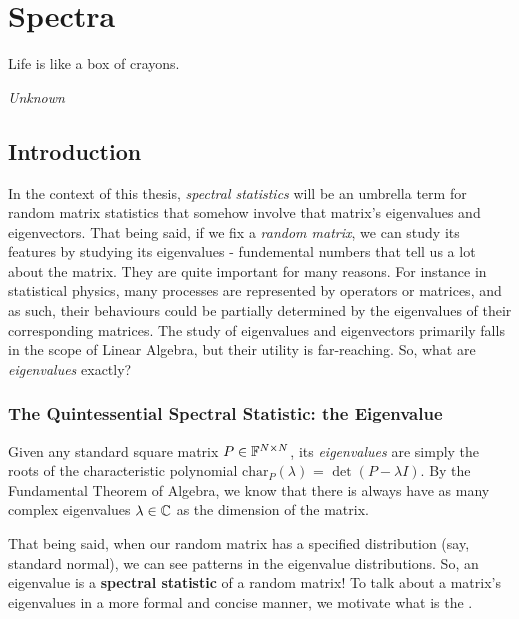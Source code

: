 
\chapter{Spectra}

\epigraph{Life is like a box of crayons.}{\textit{Unknown}}

\section{Introduction}

In the context of this thesis, \textit{spectral statistics} will be an umbrella term for random matrix statistics that somehow involve that matrix's eigenvalues and eigenvectors.
That being said, if we fix a \textit{random matrix}, we can study its features by studying its eigenvalues - fundemental numbers that tell us a lot about the matrix.
They are quite important for many reasons.
For instance in statistical physics, many processes are represented by operators or matrices, and as such, their behaviours could be partially determined by the eigenvalues of their corresponding matrices.
The study of eigenvalues and eigenvectors primarily falls in the scope of Linear Algebra, but their utility is far-reaching. So, what are \textit{eigenvalues} exactly?


\subsection{The Quintessential Spectral Statistic: the Eigenvalue}
Given any standard square matrix $P \in \mathbb{F}^{N \times N}$, its \textit{eigenvalues} are simply the roots of the characteristic polynomial $\text{char}_P{(\lambda)}$ = $\det(P - \lambda I)$.
By the Fundamental Theorem of Algebra, we know that there is always have as many complex eigenvalues $\lambda \in \mathbb{C}$ as the dimension of the matrix.

That being said, when our random matrix has a specified distribution (say, standard normal), we can see patterns in the eigenvalue distributions.
So, an eigenvalue is a \textbf{spectral statistic} of a random matrix! To talk about a matrix's eigenvalues in a more formal and concise manner, we motivate what is the .

